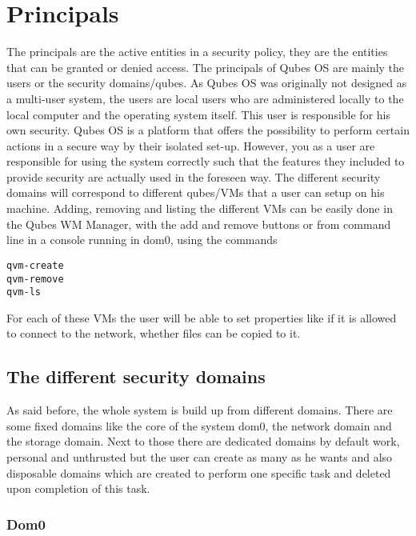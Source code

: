 \documentclass[runningheads,a4paper]{article}
\begin{document}
\section{Principals} 

The principals are the active entities in a security policy, they are
the entities that can be granted or denied access. The principals of
Qubes OS are mainly the users or the security domains/qubes. As Qubes OS was originally not designed
as a multi-user system, the users are local users who are administered
locally to the local computer and the operating system itself. This
user is responsible for his own security. Qubes OS is a platform that
offers the possibility to perform certain actions in a secure way by
their isolated set-up. However, you as a user are responsible for
using the system correctly such that the features they included to
provide security are actually used in the foreseen way. The different
security domains will correspond to different qubes/VMs that a user
can setup on his machine.  Adding, removing and listing the different
VMs can be easily done in the Qubes WM Manager, with the add and
remove buttons or from command line in a console running in dom0,
using the commands
\begin{verbatim}
qvm-create
qvm-remove
qvm-ls
\end{verbatim}
For each of these VMs the user will be able to set properties like if
it is allowed to connect to the network, whether files can be copied
to it. 


\subsection{The different security domains}
As said before, the whole system is build up from different
domains. There are some fixed domains like the core of the system
dom0, the network domain and the storage domain. Next to those there
are dedicated domains by default work, personal and unthrusted but the
user can create as many as he wants and also disposable domains which
are created to perform one specific task and deleted upon completion
of this task.

\subsubsection{Dom0}
\end{document}
